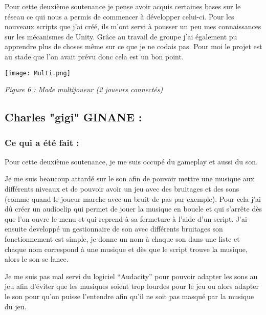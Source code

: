 \documentclass{article}
\begin{document}
Pour cette deuxième soutenance je pense avoir acquis certaines bases sur le réseau ce qui nous a permis de commencer à développer celui-ci. Pour les nouveaux scripts que j’ai créé, ils m’ont servi à pousser un peu mes connaissances sur les mécanismes de Unity. Grâce au travail de groupe j’ai également pu apprendre plus de choses même sur ce que je ne codais pas. Pour moi le projet est au stade que l’on avait prévu donc cela est un bon point.


\quad

\quad

\begin{centering}

\texttt{[image: Multi.png]}

\quad

\textit{Figure 6 : Mode multijoueur (2 joueurs connectés) }

\end{centering}

\quad

\quad

\newpage

	\subsection{Charles "gigi" GINANE :}


\quad

		\subsubsection{Ce qui a été fait :}


\quad

Pour cette deuxième soutenance, je me suis occupé du gameplay et aussi du son. 

Je me suis beaucoup attardé sur le son afin de pouvoir mettre une musique aux différents niveaux et de pouvoir avoir un jeu avec des bruitages et des sons (comme quand le joueur marche avec un bruit de pas par exemple). Pour cela j’ai dû créer un audioclip qui permet de jouer la musique en boucle et qui s’arrête dès que l’on ouvre le menu et qui reprend à sa fermeture à l’aide d’un script. J’ai ensuite developpé un gestionnaire de son avec différents bruitages son fonctionnement est simple, je donne un nom à chaque son dans une liste et chaque nom correspond à une musique et dès que le script trouve la musique, alors le son se lance. 


Je me suis pas mal servi du logiciel “Audacity” pour pouvoir adapter les sons au jeu afin d’éviter que les musiques soient trop lourdes pour le jeu ou alors adapter le son pour qu’on puisse l’entendre afin qu’il ne soit pas masqué par la musique du jeu.
\end{document}
